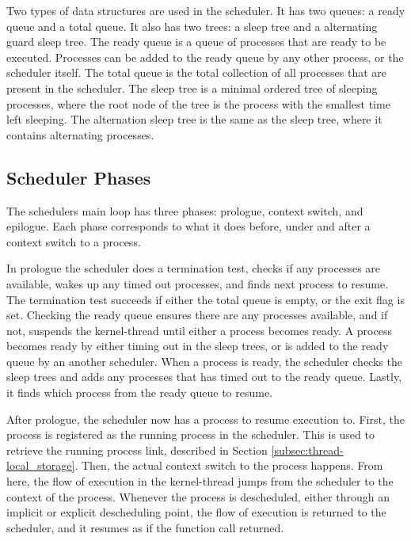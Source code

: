 Two types of data structures are used in the scheduler. It has two queues: a ready queue and a total queue. It also has two trees: a sleep tree and a alternating guard sleep tree. The ready queue is a queue of processes that are ready to be executed. Processes can be added to the ready queue by any other process, or the scheduler itself. The total queue is the total collection of all processes that are present in the scheduler. The sleep tree is a minimal ordered tree of sleeping processes, where the root node of the tree is the process with the smallest time left sleeping. The alternation sleep tree is the same as the sleep tree, where it contains alternating processes.


\subsection{Scheduler Phases}
\label{subsec:scheduler_phases}

The schedulers main loop has three phases: prologue, context switch, and epilogue. Each phase corresponds to what it does before, under and after a context switch to a process. 

In prologue the scheduler does a termination test, checks if any processes are available, wakes up any timed out processes, and finds next process to resume. The termination test succeeds if either the total queue is empty, or the exit flag is set. Checking the ready queue ensures there are any processes available, and if not, suspends the kernel\hyp{}thread until either a process becomes ready. A process becomes ready by either timing out in the sleep trees, or is added to the ready queue by an another scheduler. When a process is ready, the scheduler checks the sleep trees and adds any processes that has timed out to the ready queue. Lastly, it finds which process from the ready queue to resume.

After prologue, the scheduler now has a process to resume execution to. First, the process is registered as the running process in the scheduler. This is used to retrieve the running process link, described in Section \ref{subsec:thread-local_storage}. Then, the actual context switch to the process happens. From here, the flow of execution in the kernel\hyp{}thread jumps from the scheduler to the context of the process. Whenever the process is descheduled, either through an implicit or explicit descheduling point, the flow of execution is returned to the scheduler, and it resumes as if the function call returned.

